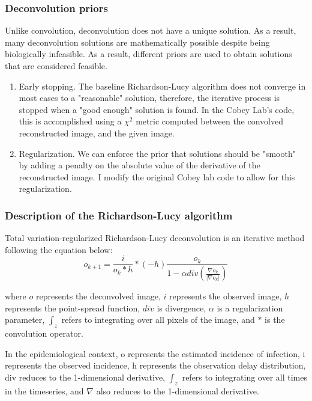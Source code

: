 \documentclass{article}
\begin{document}
{\subsubsection{Deconvolution priors}
Unlike convolution, deconvolution does not have a unique solution. As a result, many deconvolution solutions are mathematically possible despite being biologically infeasible. As a result, different priors are used to obtain solutions that are considered feasible.

\begin{enumerate}
	\item Early stopping. The baseline Richardson-Lucy algorithm does not converge in most cases to a "reasonable" solution, therefore, the iterative process is stopped when a "good enough" solution is found. In the Cobey Lab's code, this is accomplished using a $\chi^2$ metric computed between the convolved reconstructed image, and the given image. 
	 \item Regularization. We can enforce the prior that solutions should be "smooth" by adding a penalty on the absolute value of the derivative of the reconstructed image. I modify the original Cobey lab code to allow for this regularization.
\end{enumerate}

\subsubsection{Description of the Richardson-Lucy algorithm}
Total variation-regularized Richardson-Lucy deconvolution is an iterative method following the equation below: \cite{RLLoss}
\begin{equation}
    o_{k+1} = \frac{i}{o_k * h} * (-h) \frac{o_k}{1-\alpha div(\frac{\nabla o_k}{|\nabla o_k|})}
\end{equation}

where $o$ represents the deconvolved image, $i$ represents the observed image, $h$ represents the point-spread function, $div$ is divergence, $\alpha$ is a regularization parameter, $\int_z$ refers to integrating over all pixels of the image, and $*$ is the convolution operator.

In the epidemiological context, o represents the estimated incidence of infection, i represents the observed incidence, h represents the observation delay distribution, div reduces to the 1-dimensional derivative, $\int_z$ refers to integrating over all times in the timeseries, and $\nabla$ also reduces to the 1-dimensional derivative.

}
\end{document}
